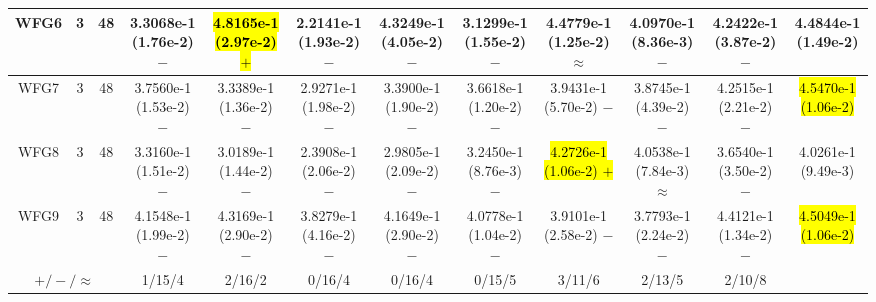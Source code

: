 \documentclass[journal]{IEEEtran}
\begin{document}
\begin{table*}[htbp]
\begin{tabular}{cccccccccccc}
\hline
\multirow{1}{*}{WFG6}&3&48&3.3068e-1 (1.76e-2) $-$&\hl{4.8165e-1 (2.97e-2) $+$}&2.2141e-1 (1.93e-2) $-$&4.3249e-1 (4.05e-2) $-$&3.1299e-1 (1.55e-2) $-$&4.4779e-1 (1.25e-2) $\approx$&4.0970e-1 (8.36e-3) $-$&4.2422e-1 (3.87e-2) $-$&4.4844e-1 (1.49e-2)\\
\hline
\multirow{1}{*}{WFG7}&3&48&3.7560e-1 (1.53e-2) $-$&3.3389e-1 (1.36e-2) $-$&2.9271e-1 (1.98e-2) $-$&3.3900e-1 (1.90e-2) $-$&3.6618e-1 (1.20e-2) $-$&3.9431e-1 (5.70e-2) $-$&3.8745e-1 (4.39e-2) $-$&4.2515e-1 (2.21e-2) $-$&\hl{4.5470e-1 (1.06e-2)}\\
\hline
\multirow{1}{*}{WFG8}&3&48&3.3160e-1 (1.51e-2) $-$&3.0189e-1 (1.44e-2) $-$&2.3908e-1 (2.06e-2) $-$&2.9805e-1 (2.09e-2) $-$&3.2450e-1 (8.76e-3) $-$&\hl{4.2726e-1 (1.06e-2) $+$}&4.0538e-1 (7.84e-3) $\approx$&3.6540e-1 (3.50e-2) $-$&4.0261e-1 (9.49e-3)\\
\hline
\multirow{1}{*}{WFG9}&3&48&4.1548e-1 (1.99e-2) $-$&4.3169e-1 (2.90e-2) $-$&3.8279e-1 (4.16e-2) $-$&4.1649e-1 (2.90e-2) $-$&4.0778e-1 (1.04e-2) $-$&3.9101e-1 (2.58e-2) $-$&3.7793e-1 (2.24e-2) $-$&4.4121e-1 (1.34e-2) $-$&\hl{4.5049e-1 (1.06e-2)}\\
\hline
\multicolumn{3}{c}{$+/-/\approx$}&1/15/4&2/16/2&0/16/4&0/16/4&0/15/5&3/11/6&2/13/5&2/10/8&\\
\bottomrule
\end{tabular}
\label{No Label}
\end{table*}
\end{document}
